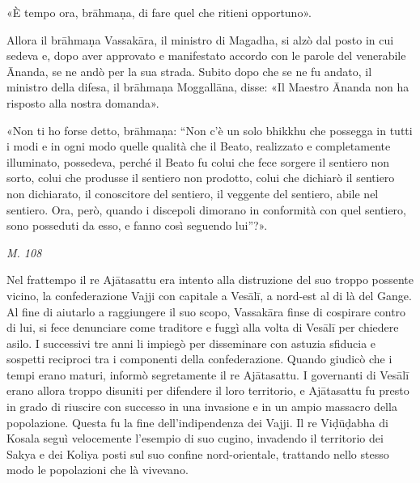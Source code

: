 «È tempo ora, brāhmaṇa, di fare quel che ritieni opportuno».


Allora il brāhmaṇa Vassakāra, il ministro di Magadha, si alzò dal posto
in cui sedeva e, dopo aver approvato e manifestato accordo con le parole
del venerabile Ānanda, se ne andò per la sua strada. Subito dopo che se
ne fu andato, il ministro della difesa, il brāhmaṇa Moggallāna, disse:
«Il Maestro Ānanda non ha risposto alla nostra domanda».


«Non ti ho forse detto, brāhmaṇa: “Non c’è un solo bhikkhu che possegga
in tutti i modi e in ogni modo quelle qualità che il Beato, realizzato e
completamente illuminato, possedeva, perché il Beato fu colui che fece
sorgere il sentiero non sorto, colui che produsse il sentiero non
prodotto, colui che dichiarò il sentiero non dichiarato, il conoscitore
del sentiero, il veggente del sentiero, abile nel sentiero. Ora, però,
quando i discepoli dimorano in conformità con quel sentiero, sono
posseduti da esso, e fanno così seguendo lui”?».


\emph{M. 108}


 Nel frattempo il re Ajātasattu era intento alla
distruzione del suo troppo possente vicino, la confederazione Vajji con
capitale a Vesālī, a nord-est al di là del Gange. Al fine di aiutarlo a
raggiungere il suo scopo, Vassakāra finse di cospirare contro di lui, si
fece denunciare come traditore e fuggì alla volta di Vesālī per chiedere
asilo. I successivi tre anni li impiegò per disseminare con astuzia
sfiducia e sospetti reciproci tra i componenti della confederazione.
Quando giudicò che i tempi erano maturi, informò segretamente il re
Ajātasattu. I governanti di Vesālī erano allora troppo disuniti per
difendere il loro territorio, e Ajātasattu fu presto in grado di
riuscire con successo in una invasione e in un ampio massacro della
popolazione. Questa fu la fine dell’indipendenza dei Vajji. Il re
Viḍūḍabha di Kosala seguì velocemente l’esempio di suo cugino, invadendo
il territorio dei Sakya e dei Koliya posti sul suo confine
nord-orientale, trattando nello stesso modo le popolazioni che là
vivevano.


